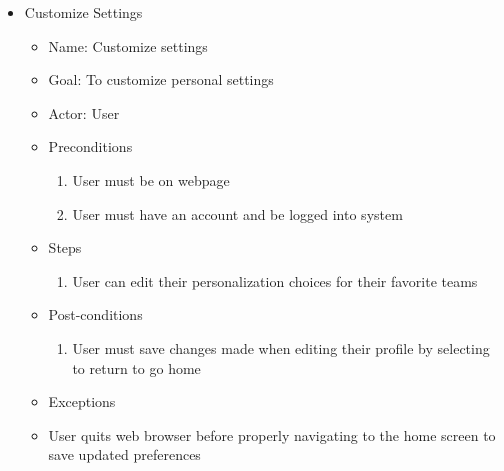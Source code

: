 \begin{itemize}
\item Customize Settings
	\begin{itemize}
	\item Name: Customize settings
    \item Goal: To customize personal settings
    \item Actor: User
    \item Preconditions
		\begin{enumerate}
		\item User must be on webpage
        \item User must have an account and be logged into system
        \end{enumerate}
    \item Steps
    	\begin{enumerate}
        \item User can edit their personalization choices for their favorite teams
        \end{enumerate}
    \item Post-conditions
    	\begin{enumerate}
		\item User must save changes made when editing their profile by selecting to return to go home
        \end{enumerate}
    \item Exceptions
    	\item User quits web browser before properly navigating to the home screen to save updated preferences
    \end{itemize}
    

\end{itemize}
